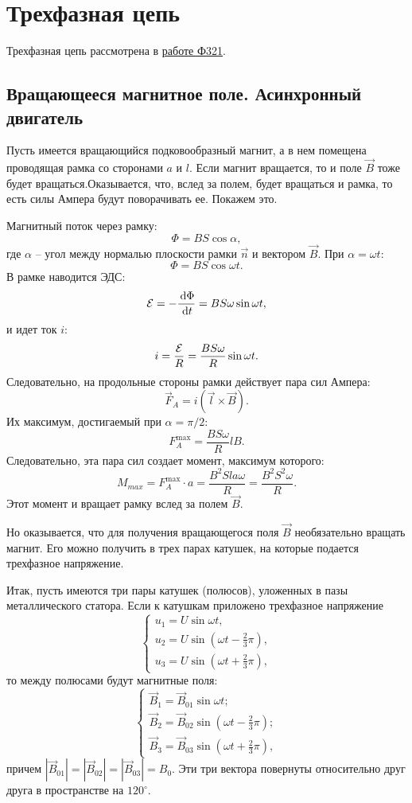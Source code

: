 \chapter{Трехфазная цепь}
	Трехфазная цепь рассмотрена в \href{http://google.com}{работе Ф321}.
	
\section{Вращающееся магнитное поле. Асинхронный двигатель}
	Пусть имеется вращающийся подковообразный магнит, а в нем помещена
    проводящая рамка со сторонами \( a \) и \( l \). Если магнит вращается, то и
    поле \( \vec{B} \) тоже будет вращаться.Оказывается, что, вслед за полем,
    будет вращаться и рамка, то есть силы Ампера будут поворачивать ее. Покажем
    это.
	
	Магнитный поток через рамку:
	\[
        \Phi = BS\cos\alpha,
    \]
	где \( \alpha \) -- угол между нормалью плоскости рамки \( \vec{n} \) и
    вектором \( \vec{B} \). При \( \alpha = \omega t \):
	\[
        \Phi = BS\cos\omega t.
    \]
	В рамке наводится ЭДС:
	\[
        \mathcal{E} = -\frac{\,\mathrm{d} \Phi}{\,\mathrm{d} t} = BS\omega\sin\omega t,
    \]
	и идет ток \( i \):
	\[
        i = \frac{\mathcal{E}}{R} = \frac{BS\omega}{R}\sin\omega t.
    \]
	Следовательно, на продольные стороны рамки действует пара сил Ампера:
	\[
        \vec{F}_{A} = i(\vec{l}\times\vec{B}).
    \]
	Их максимум, достигаемый при \( \alpha = \pi/2 \):
	\[
        F_{A}^\mathrm{max} = \frac{BS\omega}{R}lB.
    \]
	Следовательно, эта пара сил создает момент, максимум которого:
	\[
        M_{max} = F_{A}^\mathrm{max}\cdot a = \frac{B^2Sla\omega}{R} =
        \frac{B^2S^2\omega}{R}.
    \]
	Этот момент и вращает рамку вслед за полем \( \vec{B} \).
	
	Но оказывается, что для получения вращающегося поля \( \vec{B} \)
    необязательно вращать магнит. Его можно получить в трех парах катушек, на
    которые подается трехфазное напряжение.
	
	Итак, пусть имеются три пары катушек (полюсов), уложенных в пазы
    металлического статора. Если к катушкам приложено трехфазное напряжение
	\[
        \left\{
        \begin{array}{l}
            u_1 = U\sin\omega t, \\
            u_2 = U\sin\left(\omega t - \frac{2}{3}\pi\right), \\
            u_3 = U\sin\left(\omega t + \frac{2}{3}\pi\right),
	    \end{array}
        \right.
    \]
	то между полюсами будут магнитные поля:
	\[
        \left\{
        \begin{array}{l}
            \vec{B}_1 = \vec{B}_{01}\sin\omega t; \\
            \vec{B}_2 = \vec{B}_{02}\sin\left(\omega t - \frac{2}{3}\pi\right); \\
            \vec{B}_3 = \vec{B}_{03}\sin\left(\omega t + \frac{2}{3}\pi\right),
        \end{array}
        \right.
    \]
	причем \( |\vec{B}_{01}| = |\vec{B}_{02}| = |\vec{B}_{03}| = B_0 \). Эти три
    вектора повернуты относительно друг друга в пространстве на \( 120^\circ \).
	
